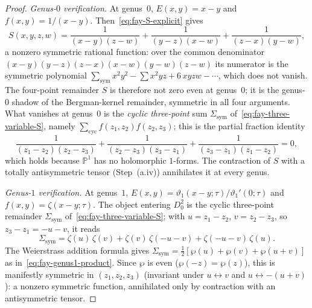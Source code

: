 \begin{proof}
\smallskip\noindent\emph{Genus-$0$ verification.}
At genus~$0$, $E(x,y) = x - y$ and $f(x,y) = 1/(x - y)$.
Then~\eqref{eq:fay-S-explicit} gives
\[
 S(x,y,z,w)
 = \frac{1}{(x-y)(z-w)}
 + \frac{1}{(y-z)(x-w)}
 + \frac{1}{(z-x)(y-w)},
\]
a nonzero symmetric rational function: over the common
denominator $(x-y)(y-z)(z-x)(x-w)(y-w)(z-w)$ its numerator is the
symmetric polynomial
$\sum_{\mathrm{sym}} x^2 y^2 - \sum x^2 yz + 6\,xyzw - \cdots$,
which does not vanish. The four-point remainder $S$ is therefore
not zero even at genus~$0$; it is the genus-$0$ shadow of the
Bergman-kernel remainder, symmetric in all four arguments. What
vanishes at genus~$0$ is the \emph{cyclic three-point} sum
$\Sigma_{\mathrm{sym}}$ of~\eqref{eq:fay-three-variable-S}, namely
$\sum_{\mathrm{cyc}} f(z_1,z_2)f(z_2,z_3)$; this is the partial
fraction identity
\[
 \frac{1}{(z_1-z_2)(z_2-z_3)}
 + \frac{1}{(z_2-z_3)(z_3-z_1)}
 + \frac{1}{(z_3-z_1)(z_1-z_2)} = 0,
\]
which holds because $\mathbb{P}^1$ has no holomorphic $1$-forms.
The contraction of $S$ with a totally antisymmetric tensor
(Step~(a.iv)) annihilates it at every genus.

\smallskip\noindent\emph{Genus-$1$ verification.}
At genus~$1$, $E(x,y) = \vartheta_1(x-y;\tau)/\vartheta_1'(0;\tau)$
and $f(x,y) = \zeta(x-y;\tau)$. The object entering $D_0^2$ is the
cyclic three-point remainder
$\Sigma_{\mathrm{sym}}$ of~\eqref{eq:fay-three-variable-S}; with
$u = z_1 - z_2$, $v = z_2 - z_3$, so $z_3 - z_1 = -u-v$, it reads
\[
 \Sigma_{\mathrm{sym}}
 = \zeta(u)\,\zeta(v)
 + \zeta(v)\,\zeta(-u-v)
 + \zeta(-u-v)\,\zeta(u).
\]
The Weierstrass addition formula gives
$\Sigma_{\mathrm{sym}} = \tfrac{1}{2}[\wp(u) + \wp(v) + \wp(u+v)]$
as in~\eqref{eq:fay-genus1-product}. Since $\wp$ is even
($\wp(-z) = \wp(z)$), this is manifestly symmetric in
$(z_1, z_2, z_3)$ (invariant under $u \leftrightarrow v$ and
$u \leftrightarrow -(u+v)$): a nonzero symmetric function,
annihilated only by contraction with an antisymmetric tensor.


\end{proof}
